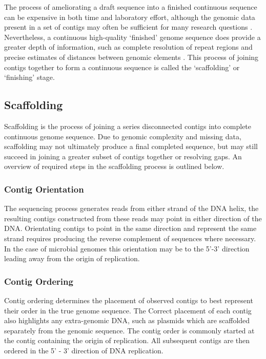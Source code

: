 \documentclass[10pt]{bmc_article}
\newenvironment{bmcformat}{\begin{raggedright}\baselineskip20pt\sloppy\setboolean{publ}{false}}{\end{raggedright}\baselineskip20pt\sloppy}
\begin{document}
\begin{bmcformat}
The process of ameliorating a draft sequence into a finished continuous
sequence can be expensive in both time and laboratory effort, although the
genomic data present in a set of contigs may often be sufficient for many
research questions \cite{branscomb2002}. Nevertheless, a continuous
high-quality `finished' genome sequence does provide a greater depth of
information, such as complete resolution of repeat regions and precise
estimates of distances between genomic elements \cite{parkhill2002,fraser2002}.
This process of joining contigs together to form a continuous sequence is
called the `scaffolding' or `finishing' stage. \pb

\subsection*{Scaffolding} %

Scaffolding is the process of joining a series disconnected contigs into
complete continuous genome sequence. Due to genomic complexity and missing
data, scaffolding may not ultimately produce a final completed sequence, but
may still succeed in joining a greater subset of contigs together or resolving
gaps. An overview of required steps in the scaffolding process is outlined
below.

\subsubsection*{Contig Orientation} %

The sequencing process generates reads from either strand of the DNA helix, the
resulting contigs constructed from these reads may point in either direction of
the DNA. Orientating contigs to point in the same direction and represent the
same strand requires producing the reverse complement of sequences where
necessary. In the case of microbial genomes this orientation may be to the
5'-3' direction leading away from the origin of replication.

\subsubsection*{Contig Ordering} %

Contig ordering determines the placement of observed contigs to best represent
their order in the true genome sequence. The Correct placement of each contig
also highlights any extra-genomic DNA, such as plasmids which are scaffolded
separately from the genomic sequence. The contig order is commonly started at
the contig containing the origin of replication. All subsequent contigs are
then ordered in the 5' - 3' direction of DNA replication.


\end{bmcformat}
\end{document}
